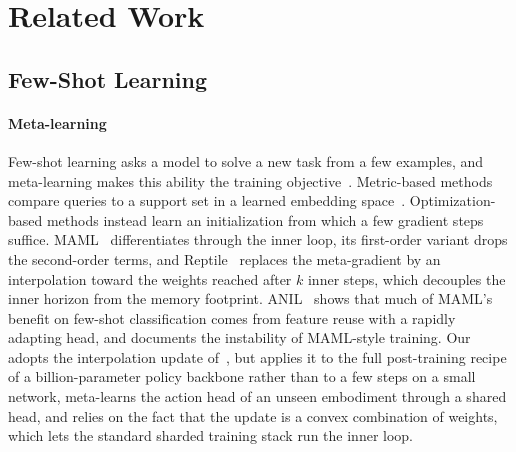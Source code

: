 \section{Related Work}
\label{sec:related}

\subsection{Few-Shot Learning}
\label{sec:related_fewshot}

\paragraph{Meta-learning}
Few-shot learning asks a model to solve a new task from a few examples, and meta-learning makes this ability the training objective~\cite{hospedales2021survey}.
Metric-based methods compare queries to a support set in a learned embedding space~\cite{vinyals2016matching,snell2017proto}.
Optimization-based methods instead learn an initialization from which a few gradient steps suffice.
MAML~\cite{finn2017maml} differentiates through the inner loop, its first-order variant drops the second-order terms, and Reptile~\cite{nichol2018reptile} replaces the meta-gradient by an interpolation toward the weights reached after $k$ inner steps, which decouples the inner horizon from the memory footprint.
ANIL~\cite{raghu2020anil} shows that much of MAML's benefit on few-shot classification comes from feature reuse with a rapidly adapting head, and \cite{antoniou2019howto} documents the instability of MAML-style training.
Our \method adopts the interpolation update of~\cite{nichol2018reptile}, but applies it to the full post-training recipe of a billion-parameter policy backbone rather than to a few steps on a small network, meta-learns the action head of an unseen embodiment through a shared head, and relies on the fact that the update is a convex combination of weights, which lets the standard sharded training stack run the inner loop.

